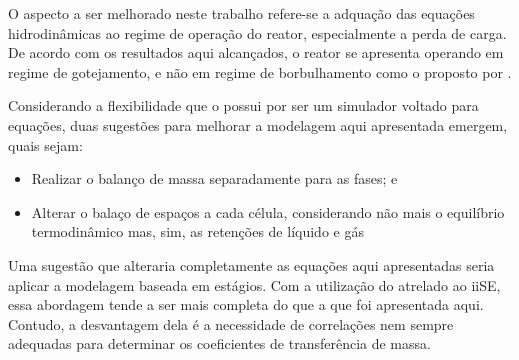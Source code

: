 O aspecto a ser melhorado neste trabalho refere-se a adquação das equações
hidrodinâmicas ao regime de operação do reator, especialmente a perda de carga.
De acordo com os resultados aqui alcançados, o reator se apresenta operando em
regime de gotejamento, e não em regime de borbulhamento como o proposto por
.

Considerando a flexibilidade que o \emso{} possui por ser um simulador
voltado para equações, duas sugestões para melhorar a modelagem aqui apresentada
emergem, quais sejam:

\begin{itemize}
\item {Realizar o balanço de massa separadamente para as fases; e}
\item {Alterar o balaço de espaços a cada célula, considerando não mais o
equilíbrio termodinâmico mas, sim, as retenções de líquido e gás}
\end{itemize}

Uma sugestão que alteraria completamente as equações aqui apresentadas seria
aplicar a modelagem baseada em estágios. Com a utilização do \emso{} atrelado ao
iiSE, essa abordagem tende a ser mais completa do que a que foi apresentada
aqui. Contudo, a desvantagem dela é a necessidade de correlações nem sempre
adequadas para determinar os coeficientes de transferência de massa.

